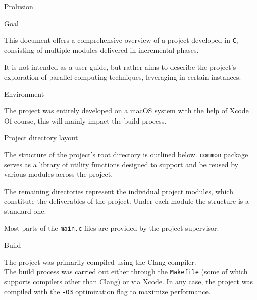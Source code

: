 \begin{chapter}{Prolusion}
	\begin{section}{Goal}
		\par This document offers a comprehensive overview of a project developed in \texttt{C}, consisting of multiple modules delivered in incremental phases.
		\par It is not intended as a user guide, but rather aims to describe the project’s exploration of parallel computing techniques, leveraging  in certain instances.
	\end{section}
	\begin{section}{Environment}
		\par The project was entirely developed on a macOS system with the help of Xcode .\\
		Of course, this will mainly impact the build process.
	\end{section}
	\clearpage
	\begin{section}{Project directory layout}
		\par The structure of the project’s root directory is outlined below.
		\medskip
		\medskip
		\texttt{common} package serves as a library of utility functions designed to support and be reused by various modules across the project.
		\par The remaining directories represent the individual project modules, which constitute the deliverables of the project. Under each module the structure is a standard one:
		\medskip
		\medskip
		\par Most parts of the \texttt{main.c} files are provided by the project supervisor.
	\end{section}
	\clearpage
	\begin{section}{Build}
		\par The project was primarily compiled using the Clang compiler.\\
		The build process was carried out either through the \texttt{Makefile} (some of which supports compilers other than Clang) or via Xcode. In any case, the project was compiled with the \texttt{-O3} optimization flag to maximize performance.

\end{section}
\end{chapter}
